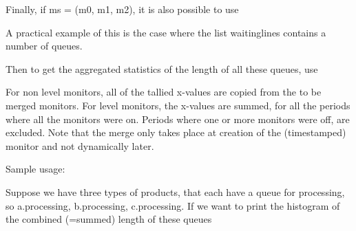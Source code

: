 \documentclass[letterpaper,10pt,english]{sphinxmanual}
\begin{document}
%
\begin{sphinxVerbatim}[commandchars=\\\{\}]
  
\end{sphinxVerbatim}

Finally, if ms = (m0, m1, m2), it is also possible to use

%
\begin{sphinxVerbatim}[commandchars=\\\{\}]
\end{sphinxVerbatim}

A practical example of this is the case where the list waitinglines contains a number of queues.

Then to get the aggregated statistics of the length of all these queues, use

%
\begin{sphinxVerbatim}[commandchars=\\\{\}]
    
\end{sphinxVerbatim}

For non level monitors, all of the tallied x-values are copied from the to be merged monitors.
For level monitors, the x-values are summed, for all the periods where all the monitors were on.
Periods where one or more monitors were off, are excluded.
Note that the merge only takes place at creation of the (timestamped) monitor and not dynamically later.

Sample usage:

Suppose we have three types of products, that each have a queue for processing, so
a.processing, b.processing, c.processing.
If we want to print the histogram of the combined (=summed) length of these queues

%
\begin{sphinxVerbatim}[commandchars=\\\{\}]
  
\end{sphinxVerbatim}
\end{document}

